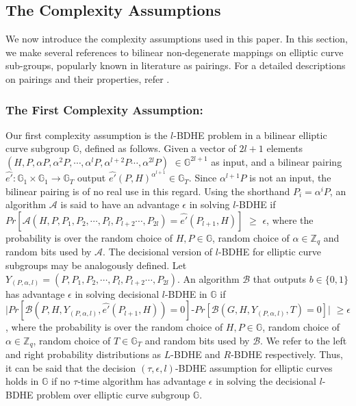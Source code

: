 \subsection{The Complexity Assumptions}

We now introduce the complexity assumptions used in this paper. In this section, we make several references to bilinear non-degenerate mappings on elliptic curve sub-groups, popularly known in literature as pairings. For a detailed descriptions on pairings and their properties, refer \cite{silverman1994advanced}.

\subsubsection{The First Complexity Assumption:}
\label{subsubsec:asm_1}

Our first complexity assumption is the $l$-BDHE problem \cite{boneh2005collusion} in a bilinear elliptic curve subgroup $\mathbb{G}$, defined as follows. Given a vector of $2l+1$ elements $(H,P,\alpha P, {\alpha}^2P,\cdots,{\alpha}^{l}P,{\alpha}^{l+2}P\cdots,{\alpha}^{2l}P)$ $\in \mathbb{G}^{2l+1}$  as input, and a bilinear pairing $\hat{e'}:\mathbb{G}_1 \times \mathbb{G}_1\longrightarrow\mathbb{G}_T$ output $\hat{e'}(P,H)^{\alpha^{l+1}}\in\mathbb{G}_T$. Since ${\alpha}^{l+1}P$ is not an input, the bilinear pairing is of no real use in this regard. Using the shorthand $P_i = \alpha^{i}P$, an algorithm $\mathcal{A}$ is said to have an advantage $\epsilon$ in solving $l$-BDHE if \\$Pr[\mathcal{A}(H,P,P_1, P_2,\cdots,P_l,P_{l+2}\cdots,P_{2l}) =\hat{e'}(P_{l+1},H)]$ $\geq$ $\epsilon$, where the probability is over the random choice of $H,P \in \mathbb{G}$, random choice of $\alpha \in \mathbb{Z}_q$ and random bits used by $\mathcal{A}$. The decisional version of $l$-BDHE for elliptic curve subgroups may be analogously defined. Let $Y_{(P,\alpha,l)}=(P,P_1, P_2,\cdots,P_l,P_{l+2}\cdots,P_{2l})$. An algorithm $\mathcal{B}$ that outputs $b\in\{0,1\}$ has advantage $\epsilon$ in solving decisional $l$-BDHE in $\mathbb{G}$ if 
$|Pr[\mathcal{B}(P,H,Y_{(P,\alpha,l)},\hat{e'}(P_{l+1},H))=0]$-$Pr[\mathcal{B}(G,H,Y_{(P,\alpha,l)},T)=0]|$ $\geq \epsilon$,
where the probability is over the random choice of $H,P \in \mathbb{G}$, random choice of $\alpha \in \mathbb{Z}_q$, random choice of $T\in \mathbb{G}_T$ and random bits used by $\mathcal{B}$. We refer to the left and right probability distributions as $L$-BDHE and $R$-BDHE respectively. Thus, it can be said that the decision $(\tau,\epsilon,l)$-BDHE assumption for elliptic curves holds in $\mathbb{G}$ if no $\tau$-time algorithm has advantage $\epsilon$  in solving the decisional $l$-BDHE problem over elliptic curve subgroup $\mathbb{G}$. 

